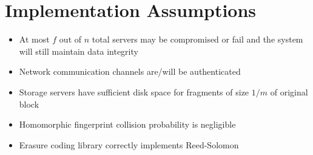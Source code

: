 \documentclass[../veristore_security_model.tex]{subfiles}
\begin{document}
\section{Implementation Assumptions}


\begin{itemize}
    \item At most $f$ out of $n$ total servers may be compromised or fail and the system will still maintain data integrity
    \item Network communication channels are/will be authenticated
    \item Storage servers have sufficient disk space for fragments of size $1/m$ of original block
    \item Homomorphic fingerprint collision probability is negligible
    \item Erasure coding library correctly implements Reed-Solomon
\end{itemize}
\end{document}
